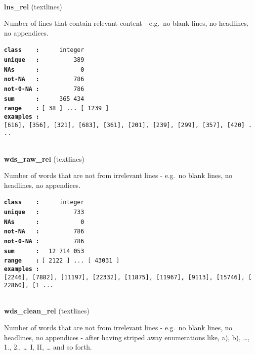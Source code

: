 \documentclass[]{article}
\begin{document}
~

\textbf{lns\_rel} (textlines)

Number of lines that contain relevant content - e.g.~no blank lines, no
headlines, no appendices.

\textbf{\texttt{class\ \ \ \ :}} \texttt{~~~~~integer}\\
\textbf{\texttt{unique\ \ \ :}} \texttt{~~~~~~~~~389}\\
\textbf{\texttt{NAs\ \ \ \ \ \ :}} \texttt{~~~~~~~~~~~0}\\
\textbf{\texttt{not-NA\ \ \ :}} \texttt{~~~~~~~~~786}\\
\textbf{\texttt{not-0-NA\ :}} \texttt{~~~~~~~~~786}\\
\textbf{\texttt{sum\ \ \ \ \ \ :}} \texttt{~~~~~365~434}\\
\textbf{\texttt{range\ \ \ \ :}}
\texttt{{[}\ 38\ {]}\ ...\ {[}\ 1239\ {]}}\\
\textbf{\texttt{examples\ :}}
\texttt{{[}616{]},\ {[}356{]},\ {[}321{]},\ {[}683{]},\ {[}361{]},\ {[}201{]},\ {[}239{]},\ {[}299{]},\ {[}357{]},\ {[}420{]}\ ...}\\

~

\textbf{wds\_raw\_rel} (textlines)

Number of words that are not from irrelevant lines - e.g.~no blank
lines, no headlines, no appendices.

\textbf{\texttt{class\ \ \ \ :}} \texttt{~~~~~integer}\\
\textbf{\texttt{unique\ \ \ :}} \texttt{~~~~~~~~~733}\\
\textbf{\texttt{NAs\ \ \ \ \ \ :}} \texttt{~~~~~~~~~~~0}\\
\textbf{\texttt{not-NA\ \ \ :}} \texttt{~~~~~~~~~786}\\
\textbf{\texttt{not-0-NA\ :}} \texttt{~~~~~~~~~786}\\
\textbf{\texttt{sum\ \ \ \ \ \ :}} \texttt{~~12~714~053}\\
\textbf{\texttt{range\ \ \ \ :}}
\texttt{{[}\ 2122\ {]}\ ...\ {[}\ 43031\ {]}}\\
\textbf{\texttt{examples\ :}}
\texttt{{[}2246{]},\ {[}7882{]},\ {[}11197{]},\ {[}22332{]},\ {[}11875{]},\ {[}11967{]},\ {[}9113{]},\ {[}15746{]},\ {[}22860{]},\ {[}1\ ...}\\

~

\textbf{wds\_clean\_rel} (textlines)

Number of words that are not from irrelevant lines - e.g.~no blank
lines, no headlines, no appendices - after having striped away
enumerations like, a), b), \ldots{}, 1., 2., \ldots{} I, II, \ldots{}
and so forth.
\end{document}
